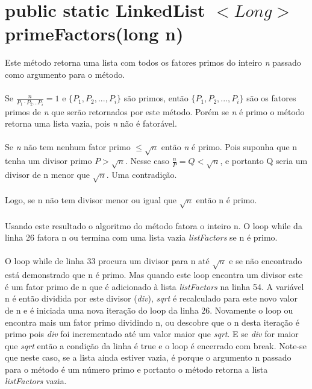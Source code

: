 \documentclass[a4paper,12pt,openany]{book}
\begin{document}
\section*{public static LinkedList $<Long>$ primeFactors(long n)}

Este método retorna uma lista com todos os fatores primos do inteiro \textit{n} passado como argumento para o método.
\\
\\
Se $ \frac{n}{P_1 \cdot P_2 ... P_i} = 1 $ e $\{P_1,P_2,...,P_i\}$ são primos, então $\{P_1,P_2,...,P_i\}$ são os fatores primos de \textit{n} que serão retornados por este método. Porém se \textit{n} é primo o método retorna uma lista vazia, pois \textit{n} não é fatorável.
\\
\\
Se \textit{n} não tem nenhum fator primo $ \leq \sqrt{n} $ então \textit{n} é primo. Pois suponha que n tenha um divisor primo  $ P > \sqrt{n} $. Nesse caso $\frac{n}{P} = Q < \sqrt{n} $, e portanto Q seria um divisor de n menor que $ \sqrt{n} $. Uma contradição.
\\
\\
Logo, se n não tem divisor menor ou igual que  $ \sqrt{n} $ então n é primo.
\\
\\
Usando este resultado o algoritmo do método fatora o inteiro n. O loop while da linha 26 fatora n ou termina com uma lista vazia \textit{listFactors} se n é primo.
\\
\\
O loop while de linha 33 procura um divisor para n até $ \sqrt{n} $ e se não encontrado está demonstrado que n é primo. Mas quando este loop encontra um divisor este é um fator primo de n que é adicionado à lista \textit{listFactors} na linha 54. A variável n é então dividida por este divisor (\textit{div}), \textit{sqrt} é recalculado para este novo valor de n e é iniciada uma nova iteração do loop da linha 26. Novamente o loop ou encontra mais um fator primo dividindo \textit{}n, ou descobre que o n desta iteração é primo pois \textit{div} foi incrementado até um valor maior que \textit{sqrt}. E se \textit{div} for maior que \textit{sqrt} então a condição da linha é true e o loop é encerrado com break. Note-se que neste caso, se a lista ainda estiver vazia, é porque o argumento n passado para o método é um número primo e portanto o método retorna a lista \textit{listFactors} vazia.
\end{document}
